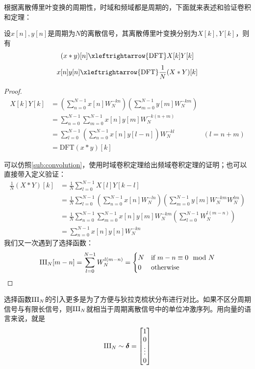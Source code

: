 根据离散傅里叶变换的周期性，时域和频域都是周期的，下面就来表述和验证卷积和定理：
\begin{theorem}[离散傅里叶变换的卷积和定理]
    设$x[n],y[n]$是周期为$N$的离散信号，其离散傅里叶变换分别为$X[k],Y[k]$，则有
    \[(x*y)[n]\xleftrightarrow{\text{DFT}}X[k]Y[k]\]
    \[x[n]y[n]\xleftrightarrow{\text{DFT}}\frac{1}{N}(X * Y)[k]\]
\end{theorem}
\begin{proof}
    \begin{align*}
        X[k]Y[k]&=\left(\sum_{n=0}^{N-1}x[n]W_N^{-kn}\right)\left(\sum_{m=0}^{N-1}y[m]W_N^{-km}\right)\\
        &=\sum_{n=0}^{N-1}\sum_{m=0}^{N-1}x[n]y[m]W_N^{-k(n+m)}\\
        &=\sum_{l=0}^{N-1}\left(\sum_{n=0}^{N-1}x[n]y[l-n]\right)W_N^{-kl}&(l=n+m)\\
        &=\text{DFT}(x*y)[k]
    \end{align*}

    可以仿照\ref{sub:convolution}，使用时域卷积定理给出频域卷积定理的证明；也可以直接带入定义验证：
    \begin{align*}
        \frac{1}{N}(X * Y)[k]&=\frac{1}{N}\sum_{l=0}^{N-1}X[l]Y[k-l]\\
        &=\frac{1}{N}\sum_{l=0}^{N-1}\left(\sum_{n=0}^{N-1}x[n]W_N^{-ln}\right)\left(\sum_{m=0}^{N-1}y[m]W_N^{-k m}W_N^{lm}\right)\\
        &=\frac{1}{N}\sum_{n=0}^{N-1}\sum_{m=0}^{N-1}x[n]y[m]W_N^{-k m}\left(\sum_{l=0}^{N-1}W_N^{l(m-n)}\right)\\
        &=\sum_{n=0}^{N-1}x[n]y[n]W_N^{-k n}
    \end{align*}
    我们又一次遇到了选择函数：
    \[\operatorname{III}_N[m-n]=\sum_{l=0}^{N-1}W_N^{l(m-n)}=\begin{cases}
    N & \text{if } m-n\equiv 0 \mod N \\
    0 & \text{otherwise}
    \end{cases}\]
\end{proof}

选择函数$\operatorname{III}_N$的引入更多是为了方便与狄拉克梳状分布进行对比。如果不区分周期信号与有限长信号，则$\operatorname{III}_N$就相当于周期离散信号中的单位冲激序列。用向量的语言来说，就是
\[\operatorname{III}_N\sim\boldsymbol{\delta}=\begin{bmatrix}
1  \\
0  \\
\vdots \\
0
\end{bmatrix}\]

